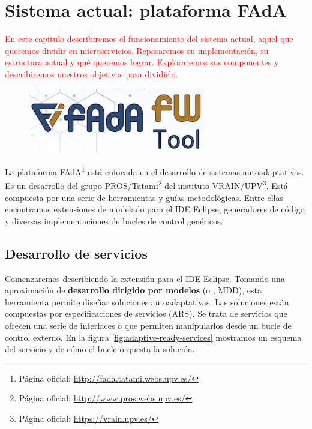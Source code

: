 \chapter{Sistema actual: plataforma FAdA}
\label{chap:sistema_original}

\textcolor{red}{En este capitulo describiremos el funcionamiento del sistema actual, aquel que queremos dividir en microservicios. Repasaremos su implementación, su estructura actual y qué queremos lograr. Exploraremos sus componentes y describiremos nuestros objetivos para dividirlo.}

\begin{figure}
  \centering
  \includegraphics[scale=0.45]{cap_sistema_original/images/fada-logo}
\end{figure}

La plataforma FAdA\footnote{Página oficial: \url{http://fada.tatami.webs.upv.es/}} está enfocada en el desarrollo de sistemas autoadaptativos. Es un desarrollo del grupo PROS/Tatami\footnote{Página oficial: \url{http://www.pros.webs.upv.es/}} del instituto VRAIN/UPV\footnote{Página oficial: \url{https://vrain.upv.es/}}. Está compuesta por una serie de herramientas y guías metodológicas. Entre ellas encontramos extensiones de modelado para el IDE Eclipse, generadores de código y diversas implementaciones de bucles de control genéricos.

\section{Desarrollo de servicios }

Comenzaremos describiendo la extensión para el IDE Eclipse. Tomando una aproximación de \textbf{desarrollo dirigido por modelos} (o , MDD), esta herramienta permite diseñar soluciones autoadaptativas. Las soluciones están compuestas por especificaciones de servicios \textbf{} (ARS). \cite{fonsServiciosAdaptivereadyPara2021} Se trata de servicios que ofrecen una serie de interfaces o  que permiten manipularlos desde un bucle de control externo. En la figura \ref{fig:adaptive-ready-services} mostramos un esquema del servicio y de cómo el bucle orquesta la solución.

